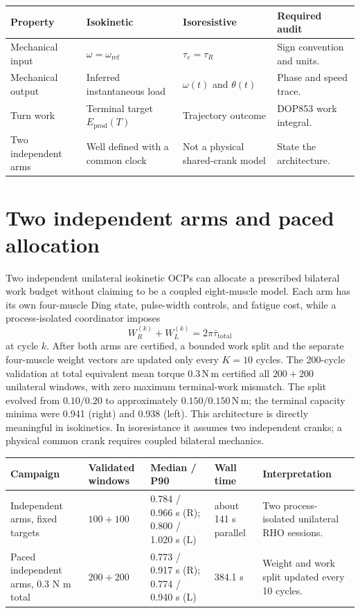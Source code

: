 \documentclass[10pt]{article}
\begin{document}
\begin{longtable}{@{}p{}p{}p{}p{}@{}}
\toprule
Property & Isokinetic & Isoresistive & Required audit\\
\midrule
\endhead
Mechanical input & $\omega=\omega_{\mathrm{ref}}$ & $\tau_e=\tau_R$ & Sign convention and units.\\
Mechanical output & Inferred instantaneous load & $\omega(t)$ and $\theta(t)$ & Phase and speed trace.\\
Turn work & Terminal target $E_{\mathrm{prod}}(T)$ & Trajectory outcome & DOP853 work integral.\\
Two independent arms & Well defined with a common clock & Not a physical shared-crank model & State the architecture.\\
\bottomrule
\end{longtable}

\section{Two independent arms and paced allocation}

Two independent unilateral isokinetic OCPs can allocate a prescribed bilateral work budget without claiming to be a coupled eight-muscle model. Each arm has its own four-muscle Ding state, pulse-width controls, and fatigue cost, while a process-isolated coordinator imposes
\[
W_R^{(k)}+W_L^{(k)}=2\pi\bar\tau_{\mathrm{total}}
\]
at cycle $k$. After both arms are certified, a bounded work split and the separate four-muscle weight vectors are updated only every $K=10$ cycles. The 200-cycle validation at total equivalent mean torque $0.3\,$N\,m certified all $200+200$ unilateral windows, with zero maximum terminal-work mismatch. The split evolved from $0.10/0.20$ to approximately $0.150/0.150\,$N\,m; the terminal capacity minima were 0.941 (right) and 0.938 (left). This architecture is directly meaningful in isokinetics. In isoresistance it assumes two independent cranks; a physical common crank requires coupled bilateral mechanics.

\begin{longtable}{@{}p{}p{}p{}p{}p{}@{}}
\toprule
Campaign & Validated windows & Median / P90 & Wall time & Interpretation\\
\midrule
\endhead
Independent arms, fixed targets & $100+100$ & 0.784 / 0.966 s (R); 0.800 / 1.020 s (L) & about 141 s parallel & Two process-isolated unilateral RHO sessions.\\
Paced independent arms, 0.3 N m total & $200+200$ & 0.773 / 0.917 s (R); 0.774 / 0.940 s (L) & 384.1 s & Weight and work split updated every 10 cycles.\\
\bottomrule
\end{longtable}
\end{document}
